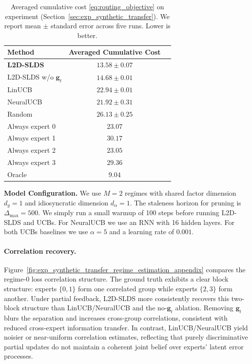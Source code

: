 \begin{table}[ht]
\centering
\small
\setlength{\tabcolsep}{4pt}
\caption{Averaged cumulative cost \eqref{eq:routing_objective} on experiment (Section~\ref{sec:exp_synthetic_transfer}).
We report mean \(\pm\) standard error across five runs. Lower is better.}
\label{tab:exp_avg_costs_appendix}
\begin{tabular}{@{}lcc@{}}
\toprule
Method & Averaged Cumulative Cost \\
\midrule
\textbf{L2D-SLDS} & \(\mathbf{13.58 \pm 0.07}\)  \\
L2D-SLDS w/o \(\mathbf{g}_t\) & \(14.68 \pm 0.01\)  \\
\midrule
LinUCB & \(22.94 \pm 0.01\)  \\
NeuralUCB & \(21.92 \pm 0.31\)  \\
Random & \(26.13 \pm 0.25\)   \\
Always expert 0 & \(23.07\)  \\
Always expert 1 & \(30.17\)  \\
Always expert 2 & \(23.05\)  \\
Always expert 3 & \(29.36\)  \\
Oracle & \(9.04\)\\
\bottomrule
\end{tabular}
\end{table}

\textbf{Model Configuration.}
We use $M = 2$ regimes with shared factor dimension $d_g = 1$ and idiosyncratic dimension $d_\alpha = 1$.
The staleness horizon for pruning is $\Delta_{\max} = 500$. We simply run a small warmup of 100 steps before
running L2D-SLDS and UCBs. For NeuralUCB we use an RNN with 16 hidden layers. For both UCBs baselines we use
$\alpha=5$ and a learning rate of $0.001$.


\paragraph{Correlation recovery.}
Figure~\ref{fig:exp_synthetic_transfer_regime_estimation_appendix} compares the regime-0 loss correlation
structure. The ground truth exhibits a clear block structure: experts \(\{0,1\}\)
form one correlated group while experts \(\{2,3\}\) form another.
Under partial feedback, L2D-SLDS more consistently recovers this two-block structure than
LinUCB/NeuralUCB and the no-\(\mathbf{g}_t\) ablation. Removing \(\mathbf{g}_t\) blurs the separation
and increases cross-group correlations, consistent with reduced cross-expert information transfer.
In contrast, LinUCB/NeuralUCB yield noisier or near-uniform correlation estimates, reflecting that
purely discriminative partial updates do not maintain a coherent joint belief over experts' latent
error processes.

